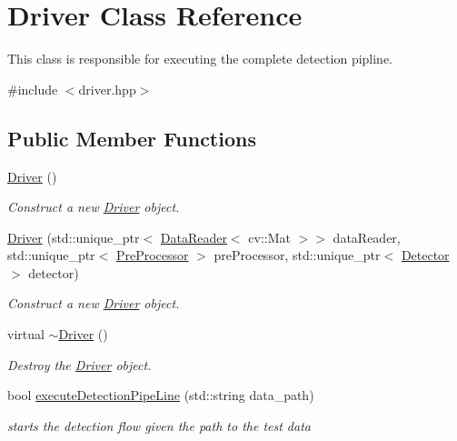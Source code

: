 \hypertarget{classDriver}{}\section{Driver Class Reference}
\label{classDriver}


This class is responsible for executing the complete detection pipline.  




{\ttfamily \#include $<$driver.\+hpp$>$}

\subsection*{Public Member Functions}
\begin{DoxyCompactItemize}
\item 
\hyperlink{classDriver_af0658d103e3e810a8e9ef0a53bb2e261}{Driver} ()
\begin{DoxyCompactList}\small\item\em Construct a new \hyperlink{classDriver}{Driver} object. \end{DoxyCompactList}\item 
\hyperlink{classDriver_a6c9f75abe2410437cd3a0091d2ed41b3}{Driver} (std\+::unique\+\_\+ptr$<$ \hyperlink{classDataReader}{Data\+Reader}$<$ cv\+::\+Mat $>$$>$ data\+Reader, std\+::unique\+\_\+ptr$<$ \hyperlink{classPreProcessor}{Pre\+Processor} $>$ pre\+Processor, std\+::unique\+\_\+ptr$<$ \hyperlink{classDetector}{Detector} $>$ detector)
\begin{DoxyCompactList}\small\item\em Construct a new \hyperlink{classDriver}{Driver} object. \end{DoxyCompactList}\item 
\mbox{\label{classDriver_ac7645eea8d3ce2bc39ddbda5e840297a}} 
virtual \hyperlink{classDriver_ac7645eea8d3ce2bc39ddbda5e840297a}{$\sim$\+Driver} ()
\begin{DoxyCompactList}\small\item\em Destroy the \hyperlink{classDriver}{Driver} object. \end{DoxyCompactList}\item 
bool \hyperlink{classDriver_a33a612943ed1cbc375f0104a2a274b97}{execute\+Detection\+Pipe\+Line} (std\+::string data\+\_\+path)
\begin{DoxyCompactList}\small\item\em starts the detection flow given the path to the test data \end{DoxyCompactList}\end{DoxyCompactItemize}


